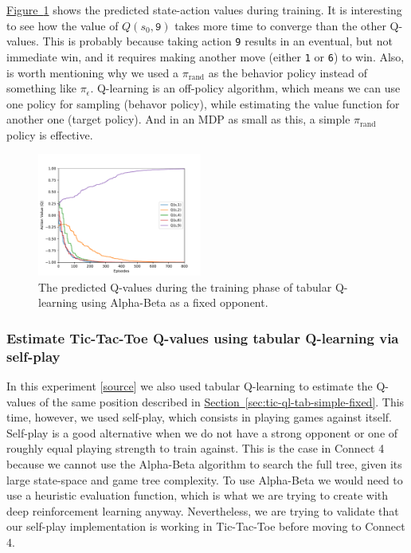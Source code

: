 \documentclass{article}
\newcommand{\GithubURL}[1]{[\href{https://github.com/davidrobles/mlnd-capstone-code/blob/master/#1}{source}]}
\begin{document}
\hyperref[fig:tic-ql-tab-qvalues-progress] {Figure~\ref*{fig:tic-ql-tab-qvalues-progress}} shows the
predicted state-action values during training. It is interesting to see how the value of $Q(s_0,
\texttt{9})$ takes more time to converge than the other Q-values. This is probably because taking
action \texttt{9} results in an eventual, but not immediate win, and it requires making another move
(either \texttt{1} or \texttt{6}) to win. Also, is worth mentioning why we used a
$\pi_{\textrm{rand}}$ as the behavior policy instead of something like $\pi_{\epsilon}$. Q-learning
is an off-policy algorithm, which means we can use one policy for sampling (behavor policy), while
estimating the value function for another one (target policy). And in an MDP as small as this, a
simple $\pi_{\textrm{rand}}$ policy is effective.


\begin{figure}[!h]
    \centering
    \includegraphics[width=0.48\textwidth]{figures/tic_ql_tab_action_values.pdf}
    \caption{The predicted Q-values during the training phase of tabular
             Q-learning using Alpha-Beta as a fixed opponent.}
    \label{fig:tic-ql-tab-qvalues-progress}
\end{figure}

\subsubsection{Estimate Tic-Tac-Toe Q-values using tabular Q-learning via self-play}

In this experiment \GithubURL{experiments/tic_ql_tab_simple_selfplay.py} we also used tabular
Q-learning to estimate the Q-values of the same position described in
\hyperref[sec:tic-ql-tab-simple-fixed] {Section~\ref*{sec:tic-ql-tab-simple-fixed}}. This time,
however, we used self-play, which consists in playing games against itself. Self-play is a good
alternative when we do not have a strong opponent or one of roughly equal playing strength to train
against. This is the case in Connect 4 because we cannot use the Alpha-Beta algorithm to search the
full tree, given its large state-space and game tree complexity. To use Alpha-Beta we would need to
use a heuristic evaluation function, which is what we are trying to create with deep reinforcement
learning anyway. Nevertheless, we are trying to validate that our self-play implementation is
working in Tic-Tac-Toe before moving to Connect 4.
\end{document}
